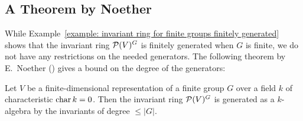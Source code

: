 \subsection{A Theorem by Noether}


\begin{fluff}
  While Example~\ref{example: invariant ring for finite groups finitely generated} shows that the invariant ring $\mathcal{P}(V)^G$ is finitely generated when $G$ is finite, we do not have any restrictions on the needed generators.
  The following theorem by E.\ Noether (\cite{Noether1915}) gives a bound on the degree of the generators:
\end{fluff}


\begin{theorem}[Noether]
  Let $V$ be a finite-dimensional representation of a finite group $G$ over a field $k$ of characteristic $\operatorname{char}{k} = 0$.
  Then the invariant ring $\mathcal{P}(V)^G$ is generated as a $k$-algebra by the invariants of degree $\leq |G|$.
\end{theorem}


